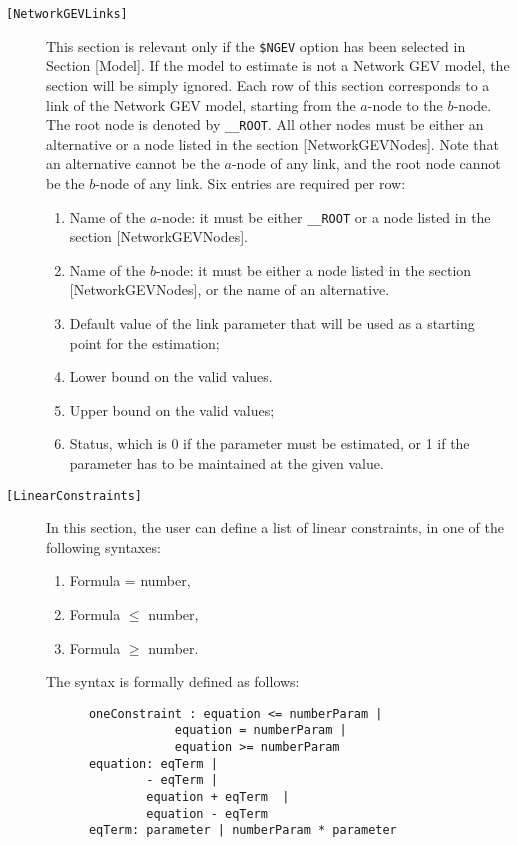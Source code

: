 \documentclass[12pt,a4paper]{article}
\newcommand{\specitem}[1]{\texttt{[#1]}}
\begin{document}
\begin{description}
   \item[\specitem{NetworkGEVLinks}] This section is relevant only if the
      \verb+$NGEV+ option has been selected in Section
      [Model]. If the model to estimate is not a Network GEV model, the section
      will be simply ignored.  Each row of this section corresponds to a link of the
      Network GEV model, starting from the $a$-node to the $b$-node.
       The root node is denoted by \verb+__ROOT+.
       All other nodes must be either an alternative or a node listed in
       the section [NetworkGEVNodes].
       Note that an alternative cannot be the $a$-node of any link,
       and the root node cannot be the $b$-node of any link.
       Six entries are required per row: 
      \begin{enumerate}
         \item Name of the $a$-node: it must be either \verb+__ROOT+ or  a node listed in
            the section [NetworkGEVNodes].  
         \item Name of the $b$-node: it must be either a node listed in
             the section [NetworkGEVNodes], or the name of an
            alternative.  
         \item Default value of the link parameter that will be used as a starting point for the estimation;
         \item Lower bound on the valid values.
         \item Upper bound on the valid values;
         \item Status, which is 0 if the parameter must be estimated, or 1 if the parameter has to be maintained at the given value. 
      \end{enumerate}


   \item[\specitem{LinearConstraints}]
      In this section, the user can define a list of linear constraints, in one of the following syntaxes:
      \begin{enumerate}
         \item Formula = number,
         \item Formula $\leq$ number,
         \item Formula $\geq$ number.
      \end{enumerate}
      
      The syntax is formally defined as follows:
      \begin{verbatim}
      oneConstraint : equation <= numberParam | 
                  equation = numberParam | 
                  equation >= numberParam  
      equation: eqTerm |  
              - eqTerm | 
              equation + eqTerm  | 
              equation - eqTerm 
      eqTerm: parameter | numberParam * parameter 
      \end{verbatim}
      

\end{description}
\end{document}
